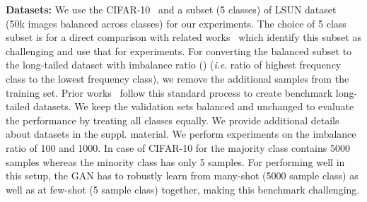 \documentclass[runningheads,table]{llncs}
\newcommand{\ie}{\textit{i}.\textit{e}. }
\begin{document}
\noindent\textbf{Datasets:} We use the CIFAR-10~\cite{Krizhevsky09learningmultiple} and a subset (5 classes) of LSUN dataset~\cite{journals/corr/YuZSSX15} (50k images balanced across classes) for our experiments. 
The choice of 5 class subset is for a direct comparison with related works~\cite{rangwani2021class, santurkar2018classification} which identify this subset as challenging and use that for experiments.
For converting the balanced subset to the long-tailed dataset with imbalance ratio () (\ie ratio of highest frequency class to the lowest frequency class), we remove the additional samples from the training set. Prior works~\cite{cao2019learning, cui2019classbalancedloss, menon2021longtail} follow this standard process to create benchmark long-tailed datasets. We keep the validation sets balanced and unchanged to evaluate the performance by treating all classes equally. We provide additional details about datasets in the suppl. material. We perform experiments on the imbalance ratio of 100 and 1000. In case of CIFAR-10 for  the majority class contains 5000 samples whereas the minority class has only 5 samples. For performing well in this setup, the GAN has to robustly learn from many-shot (5000 sample class) as well as at few-shot (5 sample class) together, making this benchmark challenging.

\setlength{\intextsep}{0pt}\begin{table*}[t]
    \centering
    \caption{\textbf{Quantitative results on the CIFAR-10 and LSUN dataset.} On an average, we observe a relative improvement in FID of 20.33\% and 39.08\% over SNGAN and BigGAN baselines respectively.}
    \label{tab:main_results}
\end{table*}
\end{document}
